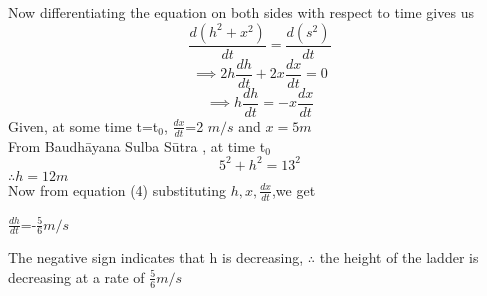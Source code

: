 \documentclass[journal,12pt,twocolumn]{IEEEtran}
\begin{document}
 Now differentiating the equation on both sides with respect to time gives us\\
 \begin{equation}
 \frac{d(h^2+x^2)}{dt}=\frac{d(s^2)}{dt}
 \end{equation}
 \begin{equation}
  \implies 2h\frac{dh}{dt}+2x\frac{dx}{dt}=0
 \end{equation}
 \begin{equation}
 \implies h\frac{dh}{dt}=-x\frac{dx}{dt}
 \end{equation}
 Given, at some time t=t$_0$,
  $\frac{dx}{dt}$=2 $m/s$ and $x= 5 m$\\
  From Baudhāyana Sulba Sūtra , at time t$_0$
  \begin{equation}
  5^2+h^2=13^2
  \end{equation}
  $\therefore h= 12 m$\\
  Now from equation (4) substituting $h,x,\frac{dx}{dt}$,we get\\
  \begin{center}
   $\frac{dh}{dt}$=-$\frac{5}{6} m/s$
\end{center}  
The negative sign indicates that h is decreasing,
$\therefore$ the height of the ladder is decreasing at a rate of $\frac{5}{6} m/s$
\end{document}
